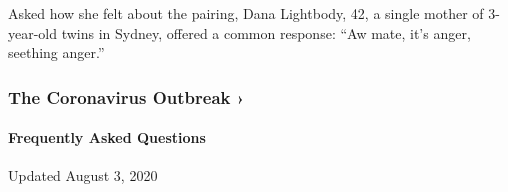 Asked how she felt about the pairing, Dana Lightbody, 42, a single
mother of 3-year-old twins in Sydney, offered a common response: ``Aw
mate, it's anger, seething anger.''

\href{https://www.nytimes.com/news-event/coronavirus?action=click\&pgtype=Article\&state=default\&region=MAIN_CONTENT_3\&context=storylines_faq}{}

\hypertarget{the-coronavirus-outbreak-}{%
\subsubsection{The Coronavirus Outbreak
›}\label{the-coronavirus-outbreak-}}

\hypertarget{frequently-asked-questions}{%
\paragraph{Frequently Asked
Questions}\label{frequently-asked-questions}}

Updated August 3, 2020

